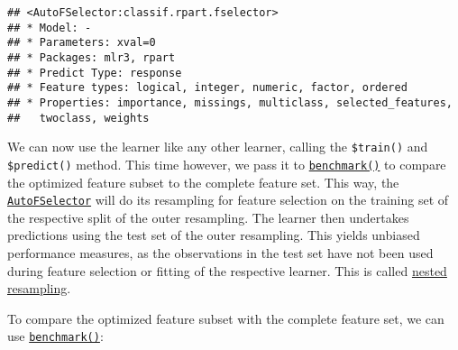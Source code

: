 \documentclass[
]{scrbook}
\newenvironment{Shaded}{\begin{snugshade}}{\end{snugshade}}
\newcommand{\AttributeTok}[1]{\textcolor[rgb]{0.77,0.63,0.00}{#1}}
\newcommand{\DecValTok}[1]{\textcolor[rgb]{0.00,0.00,0.81}{#1}}
\newcommand{\FunctionTok}[1]{\textcolor[rgb]{0.00,0.00,0.00}{#1}}
\newcommand{\NormalTok}[1]{#1}
\newcommand{\OtherTok}[1]{\textcolor[rgb]{0.56,0.35,0.01}{#1}}
\newcommand{\SpecialCharTok}[1]{\textcolor[rgb]{0.00,0.00,0.00}{#1}}
\newcommand{\StringTok}[1]{\textcolor[rgb]{0.31,0.60,0.02}{#1}}
\renewenvironment{Shaded} {\begin{snugshade}\small} {\end{snugshade}}
\begin{document}
\begin{Shaded}
\end{Shaded}

\begin{verbatim}
## <AutoFSelector:classif.rpart.fselector>
## * Model: -
## * Parameters: xval=0
## * Packages: mlr3, rpart
## * Predict Type: response
## * Feature types: logical, integer, numeric, factor, ordered
## * Properties: importance, missings, multiclass, selected_features,
##   twoclass, weights
\end{verbatim}

We can now use the learner like any other learner, calling the \texttt{\$train()} and \texttt{\$predict()} method.
This time however, we pass it to \href{https://mlr3.mlr-org.com/reference/benchmark.html}{\texttt{benchmark()}} to compare the optimized feature subset to the complete feature set.
This way, the \href{https://mlr3fselect.mlr-org.com/reference/AutoFSelector.html}{\texttt{AutoFSelector}} will do its resampling for feature selection on the training set of the respective split of the outer resampling.
The learner then undertakes predictions using the test set of the outer resampling.
This yields unbiased performance measures, as the observations in the test set have not been used during feature selection or fitting of the respective learner.
This is called \protect\hyperlink{nested-resampling}{nested resampling}.

To compare the optimized feature subset with the complete feature set, we can use \href{https://mlr3.mlr-org.com/reference/benchmark.html}{\texttt{benchmark()}}:
\end{document}
